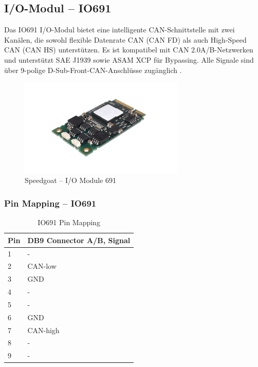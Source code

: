 \newpage
\subsection{I/O-Modul – IO691}
\label{section:IO691}

Das IO691 I/O-Modul bietet eine intelligente CAN-Schnittstelle mit zwei Kanälen, die sowohl flexible Datenrate CAN (CAN FD) als auch High-Speed CAN (CAN HS) unterstützen. Es ist kompatibel mit CAN 2.0A/B-Netzwerken und unterstützt SAE J1939 sowie ASAM XCP für Bypassing. Alle Signale sind über 9-polige D-Sub-Front-CAN-Anschlüsse zugänglich \cite{speedgoat:IO691}.

\pagebreak[1]
\begin{figure}[!ht]
	\begin{center}
		\includegraphics[width=0.7\textwidth]{img/2_steuerung/goat_io691.png}
		\caption{Speedgoat – I/O Module 691 \cite{speedgoat:IO691}}
		\label{img_2_2:goat:IO691}
	\end{center}
\end{figure}
\pagebreak[4]




\subsubsection{Pin Mapping –  IO691}

\pagebreak[1]
\begin{table}[!ht]
	\centering
	\caption{IO691 Pin Mapping}
	\label{speedgoat:IO691}
	\begin{tabular}{ll}
		\hline
		\textbf{Pin}           & \textbf{DB9 Connector A/B, Signal} \\ \hline
		\multicolumn{1}{l|}{1} & -                                  \\
		\multicolumn{1}{l|}{2} & CAN-low                            \\
		\multicolumn{1}{l|}{3} & GND                                \\
		\multicolumn{1}{l|}{4} & -                                  \\
		\multicolumn{1}{l|}{5} & -                                  \\
		\multicolumn{1}{l|}{6} & GND                                \\
		\multicolumn{1}{l|}{7} & CAN-high                           \\
		\multicolumn{1}{l|}{8} & -                                  \\
		\multicolumn{1}{l|}{9} & -                                  \\ \hline
	\end{tabular}
\end{table}
\pagebreak[4]



